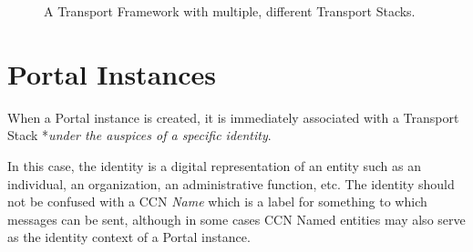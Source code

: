 \begin{figure}[ht]
\caption{A Transport Framework with multiple, different Transport Stacks.}
\end{figure}

\section{Portal Instances}
When a Portal instance is created, it is immediately associated with a Transport Stack
*{\it under the auspices of a specific identity}.

In this case, the identity is a digital representation of an entity such as an individual, an organization,
an administrative function, etc.
The identity should not be confused with a CCN {\it Name} which is a label for something to which messages can be sent, although in some cases
CCN Named entities may also serve as the identity context of a Portal instance. 

\noindent{}

